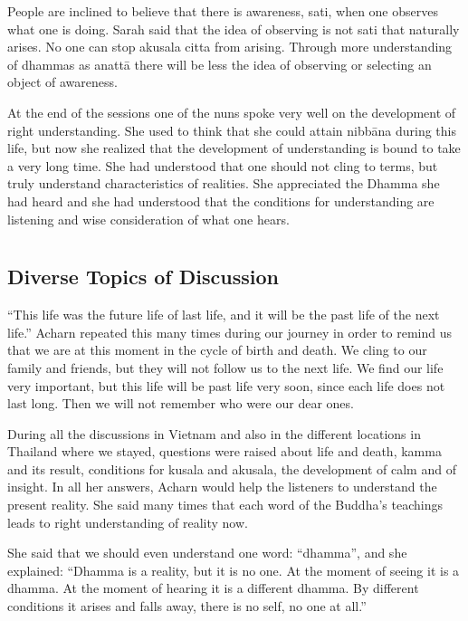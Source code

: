 People are inclined to believe that there is awareness, sati, when one
observes what one is doing. Sarah said that the idea of observing is not
sati that naturally arises. No one can stop akusala citta from arising.
Through more understanding of dhammas as anattā there will be less the
idea of observing or selecting an object of awareness.

At the end of the sessions one of the nuns spoke very well on the
development of right understanding. She used to think that she could
attain nibbāna during this life, but now she realized that the
development of understanding is bound to take a very long time. She had
understood that one should not cling to terms, but truly understand
characteristics of realities. She appreciated the Dhamma she had heard
and she had understood that the conditions for understanding are
listening and wise consideration of what one hears.

\chapter[Diverse Topics of Discussion]{}
\section*{Diverse Topics of Discussion}



``This life was the future life of last life, and it will be the past
life of the next life.'' Acharn repeated this many times during our
journey in order to remind us that we are at this moment in the cycle of
birth and death. We cling to our family and friends, but they will not
follow us to the next life. We find our life very important, but this
life will be past life very soon, since each life does not last long.
Then we will not remember who were our dear ones.

During all the discussions in Vietnam and also in the different
locations in Thailand where we stayed, questions were raised about life
and death, kamma and its result, conditions for kusala and akusala, the
development of calm and of insight. In all her answers, Acharn would
help the listeners to understand the present reality. She said many
times that each word of the Buddha's teachings leads to right
understanding of reality now.

She said that we should even understand one word: ``dhamma'', and she
explained: ``Dhamma is a reality, but it is no one. At the moment of
seeing it is a dhamma. At the moment of hearing it is a different
dhamma. By different conditions it arises and falls away, there is no
self, no one at all.''

